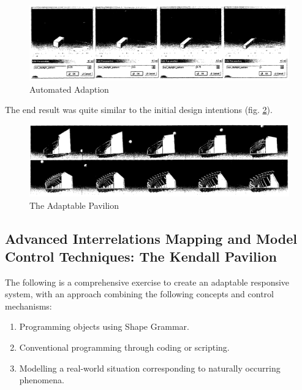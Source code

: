 \begin{figure}[htbp]
\centering
\includegraphics[width=\textwidth]{./Images/6-InteractiveCATIA}
\caption[Interactive Response]{Automated Adaption \cite{zulas04}}
\label{fig:IntActCAT}
\end{figure}

The end result was quite similar to the initial design intentions (fig. \ref{fig:FinalPav}).

\begin{figure}
\centering
\includegraphics[width=19cm]{./Images/7-FinalPavilion}
\caption[Adaptable Pavilion Design Results]{The Adaptable Pavilion \cite{zulas04}}
\label{fig:FinalPav}
\end{figure}

\newpage
\subsection{Advanced Interrelations Mapping and Model Control Techniques: The Kendall Pavilion}
\label{sec:KendallPavilion}

The following is a comprehensive exercise to create an adaptable responsive system, with an approach combining the following concepts and control mechanisms:

\begin{enumerate}
\item Programming objects using Shape Grammar.
\item Conventional programming through coding or scripting.
\item Modelling a real-world situation corresponding to naturally occurring phenomena.
\end{enumerate}

